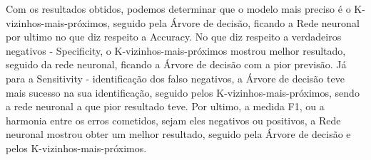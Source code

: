 Com os resultados obtidos, podemos determinar que o modelo mais preciso é o K-vizinhos-mais-próximos, seguido pela Árvore de decisão, ficando a Rede neuronal por ultimo no que diz respeito a Accuracy. No que diz respeito a verdadeiros negativos - Specificity, o K-vizinhos-mais-próximos mostrou melhor resultado, seguido da rede neuronal, ficando a Árvore de decisão com a pior previsão. Já para a Sensitivity - identificação dos falso negativos, a Árvore de decisão teve mais sucesso na sua identificação, seguido pelos K-vizinhos-mais-próximos, sendo a rede neuronal a que pior resultado teve.
Por ultimo, a medida F1, ou a harmonia entre os erros cometidos, sejam eles negativos ou positivos, a Rede neuronal mostrou obter um melhor resultado, seguido pela Árvore de decisão e pelos K-vizinhos-mais-próximos.

